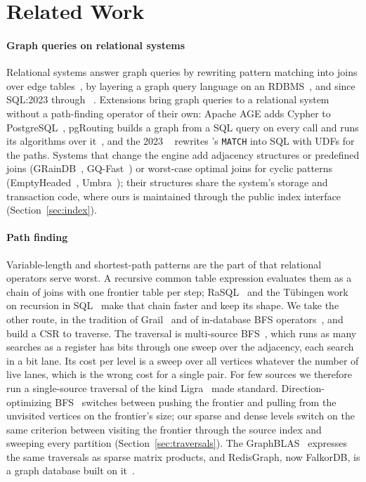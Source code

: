 \section{Related Work}
\label{sec:related}

\paragraph{Graph queries on relational systems}
Relational systems answer graph queries by rewriting pattern matching into joins over edge
tables~\cite{sun2015sqlgraph,jindal2014vertexica,fan2015grail}, by layering a graph query language on an
RDBMS~\cite{vanrest2016pgql}, and since SQL:2023 through \sqlpgq~\cite{deutsch2022gql}.
Extensions bring graph queries to a relational system without a path-finding operator of their own: Apache AGE adds
Cypher to PostgreSQL~\cite{apacheage}, pgRouting builds a graph from a SQL query on every call and runs its algorithms
over it~\cite{pgrouting}, and the 2023 \duckpgq~\cite{tenwolde2023duckpgq} rewrites \sqlpgq's \texttt{MATCH} into SQL
with UDFs for the paths. Systems that change the engine add adjacency structures or predefined joins (GRainDB~\cite{jin2022graindb,jin2022predefinedjoins}, GQ-Fast~\cite{lin2016gqfast}) or worst-case optimal joins for cyclic patterns (EmptyHeaded~\cite{aberger2017emptyheaded}, Umbra~\cite{freitag2020wcoj}); their structures share the system's storage and transaction code, where ours is maintained through the public index interface (Section~\ref{sec:index}).

\paragraph{Path finding}
Variable-length and shortest-path patterns are the part of \sqlpgq that relational operators serve worst. A recursive
common table expression evaluates them as a chain of joins with one frontier table per step; RaSQL~\cite{gu2019rasql}
and the T\"ubingen work on recursion in SQL~\cite{hirn2019recursion,hirn2021recursion} make that chain faster and keep its shape. We
take the other route, in the tradition of Grail~\cite{fan2015grail} and of in-database BFS
operators~\cite{jindal2014vertexica}, and build a CSR to traverse. The traversal is multi-source
BFS~\cite{then2014msbfs}, which runs as many searches as a register has bits through one sweep over the adjacency,
each search in a bit lane. Its cost per level is a sweep over all vertices whatever the number of live lanes, which is the wrong cost for a single pair. For few sources we therefore run a single-source traversal of the kind Ligra~\cite{shun2013ligra} made standard. Direction-optimizing BFS~\cite{beamer2012direction} switches between pushing
the frontier and pulling from the unvisited vertices on the frontier's size; our sparse and dense levels switch on the
same criterion between visiting the frontier through the source index and sweeping every partition
(Section~\ref{sec:traversals}). The GraphBLAS~\cite{davis2019graphblas} expresses the same traversals as sparse
matrix products, and RedisGraph, now FalkorDB, is a graph database built on it~\cite{cailliau2019redisgraph}.

